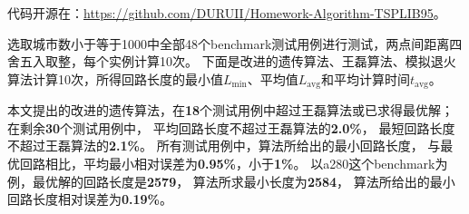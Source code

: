 \documentclass[12pt]{ctexart}
\begin{document}
代码开源在：\url{https://github.com/DURUII/Homework-Algorithm-TSPLIB95}。

选取城市数小于等于1000中全部48个benchmark测试用例进行测试，两点间距离四舍五入取整，每个实例计算10次。
下面是改进的遗传算法、王磊算法、模拟退火算法计算10次，所得回路长度的最小值$L_{\min}$、平均值$L_{\text{avg}}$和平均计算时间$t_{\text{avg}}$。

本文提出的改进的遗传算法，在\textbf{18}个测试用例中超过王磊算法或已求得最优解；
在剩余\textbf{30}个测试用例中，
平均回路长度不超过王磊算法的\textbf{2.0\%}，
最短回路长度不超过王磊算法的\textbf{2.1\%}。
所有测试用例中，算法所给出的最小回路长度，
与最优回路相比，平均最小相对误差为\textbf{0.95\%}，小于\textbf{1\%}。
以a280这个benchmark为例，最优解的回路长度是\textbf{2579}，
算法所求最小长度为\textbf{2584}，
算法所给出的最小回路长度相对误差为\textbf{0.19\%}。
\end{document}
